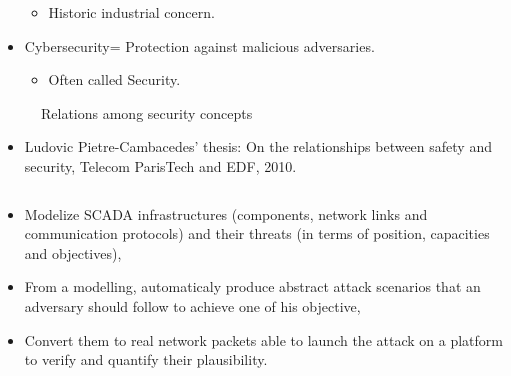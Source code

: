 \documentclass{beamer}
\newcommand{\Cybersec}{Cybersecurity\xspace}
\begin{document}
\begin{frame}[t]
\begin{columns}[T]
\begin{column}{.49\textwidth}
\begin{tcolorbox}[adjusted title={\centering\large Security concepts}]
\begin{itemize}
                        \begin{itemize}
                            \item Historic industrial concern.
                        \end{itemize}
                        \item \Cybersec = Protection against malicious adversaries.
                        \begin{itemize}
                            \item Often called Security.
                        \end{itemize}
                    \end{itemize}

                    \begin{figure}[htb]
                        \resizebox{.85\columnwidth}{!}{
                            
                        }
                        \vspace{-.2cm}
                        \caption{Relations among security concepts}
                    \end{figure}
                    \vspace{-.5cm}
                    \begin{itemize}
                        \item Ludovic Pietre-Cambacedes' thesis: On the relationships between safety and security, Telecom ParisTech and EDF, 2010.
                    \end{itemize}
                \end{tcolorbox}
            \end{column}
        \end{columns}
        \vfill
        \begin{tcolorbox}[adjusted title={\centering\large Objectives}]
            \begin{itemize}
                \item Modelize SCADA infrastructures (components, network links and communication protocols) and their threats (in terms of position, capacities and objectives),
                \item From a modelling, automaticaly produce abstract attack scenarios that an adversary should follow to achieve one of his objective,
                \item Convert them to real network packets able to launch the attack on a platform to verify and quantify their plausibility.
            \end{itemize}

\end{tcolorbox}
\end{frame}
\end{document}
